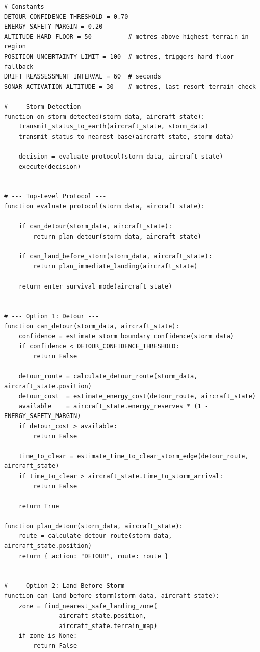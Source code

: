 \documentclass[a4paper,12pt]{article}
\begin{document}
\begin{verbatim}
# Constants
DETOUR_CONFIDENCE_THRESHOLD = 0.70
ENERGY_SAFETY_MARGIN = 0.20
ALTITUDE_HARD_FLOOR = 50          # metres above highest terrain in region
POSITION_UNCERTAINTY_LIMIT = 100  # metres, triggers hard floor fallback
DRIFT_REASSESSMENT_INTERVAL = 60  # seconds
SONAR_ACTIVATION_ALTITUDE = 30    # metres, last-resort terrain check

# --- Storm Detection ---
function on_storm_detected(storm_data, aircraft_state):
    transmit_status_to_earth(aircraft_state, storm_data)
    transmit_status_to_nearest_base(aircraft_state, storm_data)

    decision = evaluate_protocol(storm_data, aircraft_state)
    execute(decision)


# --- Top-Level Protocol ---
function evaluate_protocol(storm_data, aircraft_state):

    if can_detour(storm_data, aircraft_state):
        return plan_detour(storm_data, aircraft_state)

    if can_land_before_storm(storm_data, aircraft_state):
        return plan_immediate_landing(aircraft_state)

    return enter_survival_mode(aircraft_state)


# --- Option 1: Detour ---
function can_detour(storm_data, aircraft_state):
    confidence = estimate_storm_boundary_confidence(storm_data)
    if confidence < DETOUR_CONFIDENCE_THRESHOLD:
        return False

    detour_route = calculate_detour_route(storm_data, aircraft_state.position)
    detour_cost  = estimate_energy_cost(detour_route, aircraft_state)
    available    = aircraft_state.energy_reserves * (1 - ENERGY_SAFETY_MARGIN)
    if detour_cost > available:
        return False

    time_to_clear = estimate_time_to_clear_storm_edge(detour_route, aircraft_state)
    if time_to_clear > aircraft_state.time_to_storm_arrival:
        return False

    return True

function plan_detour(storm_data, aircraft_state):
    route = calculate_detour_route(storm_data, aircraft_state.position)
    return { action: "DETOUR", route: route }


# --- Option 2: Land Before Storm ---
function can_land_before_storm(storm_data, aircraft_state):
    zone = find_nearest_safe_landing_zone(
               aircraft_state.position,
               aircraft_state.terrain_map)
    if zone is None:
        return False


\end{verbatim}
\end{document}

